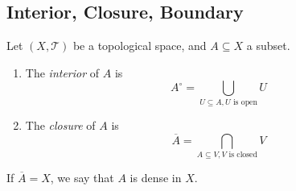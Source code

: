 \subsection{Interior, Closure, Boundary}
\begin{definition}\label{def:2:5}
Let $(X,\mathcal{T})$ be a topological space, and $A\subseteq X$ a subset.
\begin{enumerate}
\item
The \emph{interior} of $A$ is 
\[
A^\circ=\bigcup_{U\subseteq A,U\text{ is open}}U
\]
\item
The \emph{closure} of $A$ is
\[
\overline{A}=\bigcap_{A\subseteq V,V\text{ is closed}}V
\]
\end{enumerate}

If $\overline{A}=X$, we say that $A$ is dense in $X$.


\end{definition}
